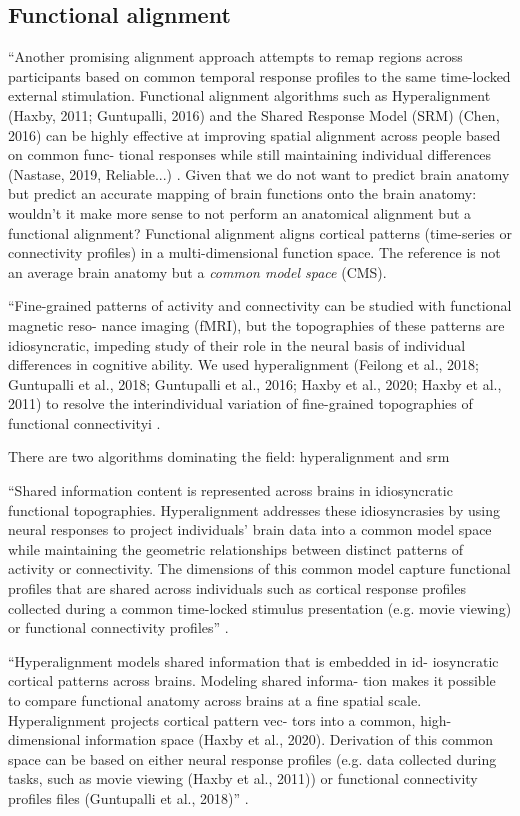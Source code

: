 {\subsection{Functional alignment}

``Another promising alignment approach attempts to remap regions across
participants based on common temporal response profiles to the same
time-locked external stimulation. Functional alignment algorithms such as
Hyperalignment (Haxby, 2011; Guntupalli, 2016) and the Shared Response Model
(SRM) (Chen, 2016) can be highly effective at improving spatial alignment across
people based on common func- tional responses while still maintaining individual
differences (Nastase, 2019, Reliable...) \citep{chang2021endogenous}.
%
Given that we do not want to predict brain anatomy but predict an accurate
mapping of brain functions onto the brain anatomy:
%
wouldn't it make more sense to not perform an anatomical alignment but a
functional alignment?
%
Functional alignment aligns cortical patterns (time-series or connectivity
profiles) in a multi-dimensional function space.
The reference is not an average brain anatomy but a \textit{common model space}
(CMS).

``Fine-grained patterns of activity and connectivity can be studied with
functional magnetic reso- nance imaging (fMRI), but the topographies of these
patterns are idiosyncratic, impeding study of their role in the neural basis of
individual differences in cognitive ability. We used hyperalignment (Feilong et
al., 2018; Guntupalli et al., 2018; Guntupalli et al., 2016; Haxby et al., 2020;
Haxby et al., 2011) to resolve the interindividual variation of fine-grained
topographies of functional connectivityi \citep{feilong2021neural}.

%
There are two algorithms dominating the field: hyperalignment and \ac{srm}

``Shared information content is represented across brains in idiosyncratic
functional topographies. Hyperalignment addresses these idiosyncrasies by using
neural responses to project individuals’ brain data into a common model space
while maintaining the geometric relationships between distinct patterns of
activity or connectivity. The dimensions of this common model capture functional
proﬁles that are shared across individuals such as cortical response proﬁles
collected during a common time-locked stimulus presentation (e.g. movie viewing)
or functional connectivity proﬁles'' \citep{busch2021hybrid}.

``Hyperalignment models shared information that is embedded in id- iosyncratic
cortical patterns across brains. Modeling shared informa- tion makes it possible
to compare functional anatomy across brains at a ﬁne spatial scale.
Hyperalignment projects cortical pattern vec- tors into a common,
high-dimensional information space (Haxby et al., 2020). Derivation of this
common space can be based on either neural response proﬁles (e.g. data collected
during tasks, such as movie viewing (Haxby et al., 2011)) or functional
connectivity profiles ﬁles (Guntupalli et al., 2018)'' \citep{busch2021hybrid}.

}
